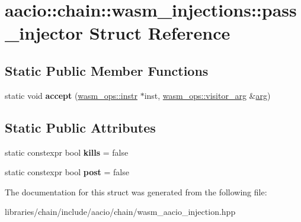 \hypertarget{structaacio_1_1chain_1_1wasm__injections_1_1pass__injector}{}\section{aacio\+:\+:chain\+:\+:wasm\+\_\+injections\+:\+:pass\+\_\+injector Struct Reference}
\label{structaacio_1_1chain_1_1wasm__injections_1_1pass__injector}
\subsection*{Static Public Member Functions}
\begin{DoxyCompactItemize}
\item 
\mbox{\label{structaacio_1_1chain_1_1wasm__injections_1_1pass__injector_ae338d4976ce67fd3a9933d95ccbb1351}} 
static void {\bfseries accept} (\mbox{\hyperlink{structaacio_1_1chain_1_1wasm__ops_1_1instr}{wasm\+\_\+ops\+::instr}} $\ast$inst, \mbox{\hyperlink{structaacio_1_1chain_1_1wasm__ops_1_1visitor__arg}{wasm\+\_\+ops\+::visitor\+\_\+arg}} \&\mbox{\hyperlink{unionarg}{arg}})
\end{DoxyCompactItemize}
\subsection*{Static Public Attributes}
\begin{DoxyCompactItemize}
\item 
\mbox{\label{structaacio_1_1chain_1_1wasm__injections_1_1pass__injector_ad63f5f873676d86bf9579ad30c49fa05}} 
static constexpr bool {\bfseries kills} = false
\item 
\mbox{\label{structaacio_1_1chain_1_1wasm__injections_1_1pass__injector_a69b7ec4b2b824d78b0f8b82229dddbd0}} 
static constexpr bool {\bfseries post} = false
\end{DoxyCompactItemize}


The documentation for this struct was generated from the following file\+:\begin{DoxyCompactItemize}
\item 
libraries/chain/include/aacio/chain/wasm\+\_\+aacio\+\_\+injection.\+hpp\end{DoxyCompactItemize}
